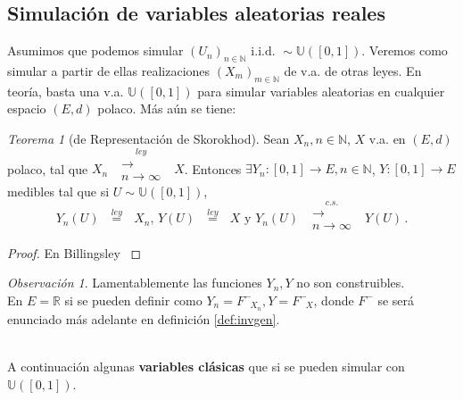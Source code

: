 \documentclass[letterpaper,11pt]{article} %
\theoremstyle{defbreak}
\theoremstyle{propbreak}
\theoremstyle{remark}
\newtheorem{remark}{Observación}[subsection]
\theoremstyle{break}
\newtheorem{theorem}{Teorema}[subsection]
\def\R{\mathbb{R}}
\def\N{\mathbb{N}}
\def\unif{\mathbb{U}([0,1])}
\def\convley{\mbox{ }\overset{ley}{\substack{\longrightarrow \\n \to \infty}}\mbox{ }}
\def\convcs{\mbox{ }\overset{c.s.}{\substack{\longrightarrow \\n \to \infty}}\mbox{ }}
\def\iid{\mbox{ i.i.d. }}
\def\gris{\color{mygray}}
\def\negro{\color{black}}
\def\Finvgen{F^-_{\mbox{ }X}}
\def\igualley{\mbox{ }\overset{ley}{=}\mbox{ }}
\begin{document}
\subsection{Simulación de variables aleatorias reales}  %
Asumimos que podemos simular $(U_n)_{n\in\N} \iid \sim \unif$. Veremos como simular a partir de ellas realizaciones $(X_m)_{m\in \N}$ de v.a. de otras leyes. En teoría, basta una v.a. $\unif$ para simular variables aleatorias en cualquier espacio $(E,d)$ polaco. Más aún se tiene:
\begin{theorem}[de Representación de Skorokhod]
\label{sko}
Sean $X_n,n\in\N$, $X$ v.a. en $(E,d)$ polaco, tal que $X_n\convley X$. Entonces $\exists Y_n:[0,1]\to E,n\in\N$, $Y:[0,1]\to E$ medibles tal que si $U\sim\unif$,
$$ Y_n(U) \igualley X_n\mbox{,  } Y(U)\igualley X \mbox{ y }Y_n(U)\convcs Y(U) \, .$$
\end{theorem}
\begin{proof}
\gris En Billingsley \cite{billing} \negro
\end{proof}
\begin{remark}
Lamentablemente las funciones $Y_n,Y$ no son construibles.%
\\ En $E=\R$ si se pueden definir como $Y_n=F^{-}_{\mbox{ }X_n},Y=\Finvgen$, donde $F^-$ se será enunciado más adelante en definición \ref{def:invgen}.
\end{remark}
\vspace{2cm}\\
A continuación algunas \textbf{variables clásicas} que si se pueden simular con $\unif$.
\end{document}
